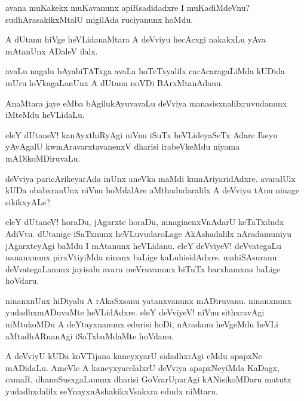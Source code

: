 \begin{mng}
avana muKakekx muKavanunx apiRsadidadxre I muKadiMdeVnu? sudhArasakikxMtalU migilAda ruciyanunx hoMdu.
\end{mng}

\begin{mng}
A dUtanu hiVge heVLidanaMtara A deVviyu hecAcxgi nakakxLu yAva mAtanUnx ADaleV ilalx.
\end{mng}

\begin{mng}
avaLu nagalu bAyabiTATxga avaLa hoTeTxyalilx carAcaragaLiMda kUDida mUru loVkagaLanUnx A dUtanu noVDi BArxMtanAdanu.
\end{mng}

\begin{mng}
AnaMtara jaye eMba bAgilukAyuvavaLu deVviya manasisxnalilxruvudanunx iMteMdu heVLidaLu.
\end{mng}

\begin{mng}
eleY dUtaneV! kanAyxthiRyAgi niVnu iSuTx heVLideyaSeTx Adare Ikeyu yAvAgalU kwmAravarxtavanenxV dharisi irabeVkeMdu niyama mADikoMDiruvaLu.
\end{mng}

\begin{mng}
deVviya paricArikeyarAda inUnx aneVka maMdi kumAriyaridAdxre. avaralUlx kUDa obabxranUnx niVnu hoMdalAre aMthadudaralilx A deVviyu tAnu ninage sikikxyALe?
\end{mng}

\begin{mng}
eleY dUtaneV! horaDu, jAgarxte horaDu, ninaginenxVnAdarU keTaTxdudx AdiVtu. dUtanige iSaTxnunx heVLuvudaroLage AkAshadalilx nAradamuniyu jAgarxteyAgi baMdu I mAtanunx heVLidanu. eleY deVviyeV! deVvategaLu nananxnunx pirxVtiyiMda ninanx baLige kaLuhisidAdxre. mahiSAsuranu deVvategaLanunx jayisalu avaru meVruvanunx biTuTx barxhamxna baLige hoVdaru.
\end{mng}

\begin{mng}
ninanxnUnx hiDiyalu A rAkaSxsanu yatanxvanunx mADiruvanu. ninanxnunx yudadhxmADuvaMte heVLidAdxre. eleY deVviyeV! niVnu sithxravAgi niMtukoMDu A deYtayxnanunx edurisi hoDi, nAradanu heVgeMdu heVLi aMtadhARnanAgi iSaTxbaMdaMte hoVdanu.
\end{mng}

\begin{mng}
A deVviyU kUDa koVTijana kaneyxyarU sidadhxrAgi eMdu apapxNe mADidaLu. AmeVle A kaneyxyarelalxrU deVviya apapxNeyiMda KaDagx, camaR, dhanuSusxgaLanunx dharisi GoVrarUparAgi kANisikoMDaru matutx yudadhxdalilx seYnayxnAshakikxVsakxra edudx niMtaru.
\end{mng}


